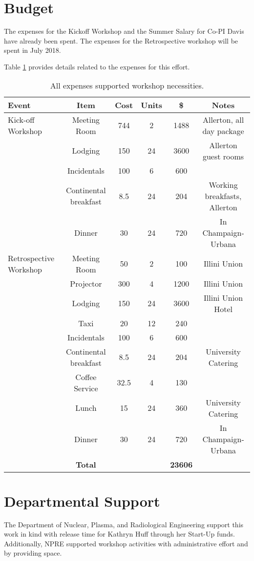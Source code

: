 \documentclass[11pt]{article}
\begin{document}
          \section{Budget}
          The expenses for the Kickoff Workshop and the Summer Salary for Co-PI 
          Davis have already been spent. The expenses for the Retrospective 
          workshop will be spent in July 2018.

          Table \ref{tab:budget} provides details related to the expenses for 
          this effort.

\begin{table}[h!]
        \begin{tabularx}{\textwidth}{|X|c|c|c|c|c|}
        \hline
        \textbf{Event} & \textbf{Item} & \textbf{Cost} & \textbf{Units} & \textbf{\$} & \textbf{Notes}\\ 
        \hline
Kick-off Workshop&Meeting Room&744&2&1488&Allerton, all day package\\
&Lodging&150&24&3600&Allerton guest rooms\\
&Incidentals&100&6&600&\\
&Continental breakfast&8.5&24&204&Working breakfasts, Allerton\\
&Dinner&30&24&720&In Champaign-Urbana\\
\hline
Retrospective Workshop&Meeting Room&50&2&100&Illini Union\\
&Projector&300&4&1200&Illini Union\\
&Lodging&150&24&3600&Illini Union Hotel\\
&Taxi&20&12&240&\\
&Incidentals&100&6&600&\\
&Continental breakfast&8.5&24&204&University Catering\\
&Coffee Service&32.5&4&130&\\
&Lunch&15&24&360&University Catering\\
&Dinner&30&24&720&In Champaign-Urbana\\
        \hline
        &\textbf{Total}&&&\textbf{23606}&\\
        \hline
\end{tabularx}
\caption{All expenses supported workshop 
necessities.}
\label{tab:budget}
\end{table}


          \section{Departmental Support}
          The Department of Nuclear, Plasma, and Radiological Engineering
          support this work in kind with release time for Kathryn Huff through 
          her Start-Up funds.  Additionally, NPRE supported workshop activities 
          with administrative effort and by providing space. 


          
          


          
\end{document}
